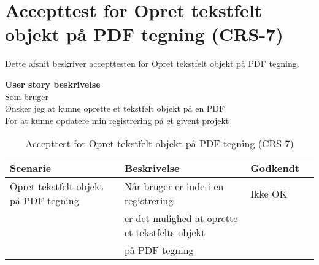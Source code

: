 \section{Accepttest for Opret tekstfelt objekt på PDF tegning (CRS-7)}
Dette afsnit beskriver accepttesten for Opret tekstfelt objekt på PDF tegning.

\textbf{User story beskrivelse} \\
Som bruger \\
Ønsker jeg at kunne oprette et tekstfelt objekt på en PDF \\
For at kunne opdatere min registrering på et givent projekt

\begin{table}[H]
	\centering
	\begin{tabular}{|ll|l|ll|} \hline
		\textbf{Scenarie} &  & \textbf{Beskrivelse}&  \textbf{Godkendt}&  \\ \hline
		Opret tekstfelt objekt på PDF tegning&  &  Når bruger er inde i en registrering &  Ikke OK&  \\
		& & er det mulighed at oprette et tekstfelts objekt& & \\ 
		& & på PDF tegning& & \\ \hline
	\end{tabular}
	\caption{Accepttest for Opret tekstfelt objekt på PDF tegning (CRS-7)}
	\label{AcceptTekstfelt}
\end{table}